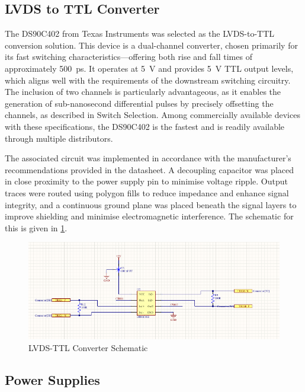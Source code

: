 \documentclass[a4paper,11pt]{article}
\begin{document}
\subsection{LVDS to TTL Converter}

The DS90C402 \cite{DS90C402} from Texas Instruments was selected as the LVDS-to-TTL conversion solution. This device is a dual-channel converter, chosen primarily for its fast switching characteristics—offering both rise and fall times of approximately 500~ps. It operates at 5~V and provides 5~V TTL output levels, which aligns well with the requirements of the downstream switching circuitry. The inclusion of two channels is particularly advantageous, as it enables the generation of sub-nanosecond differential pulses by precisely offsetting the channels, as described in Switch Selection. Among commercially available devices with these specifications, the DS90C402 is the fastest and is readily available through multiple distributors.

The associated circuit was implemented in accordance with the manufacturer's recommendations provided in the datasheet. A decoupling capacitor was placed in close proximity to the power supply pin to minimise voltage ripple. Output traces were routed using polygon fills to reduce impedance and enhance signal integrity, and a continuous ground plane was placed beneath the signal layers to improve shielding and minimise electromagnetic interference. The schematic for this is given in \cref{fig:lvdsttl}.

\begin{figure}[h!]
\centering
\includegraphics[scale=0.8]{LVDS-TTL Converter.png}
\caption{LVDS-TTL Converter Schematic\label{fig:lvdsttl}}
\end{figure}


\subsection{Power Supplies}\label{sec:LEDpower}
\end{document}
